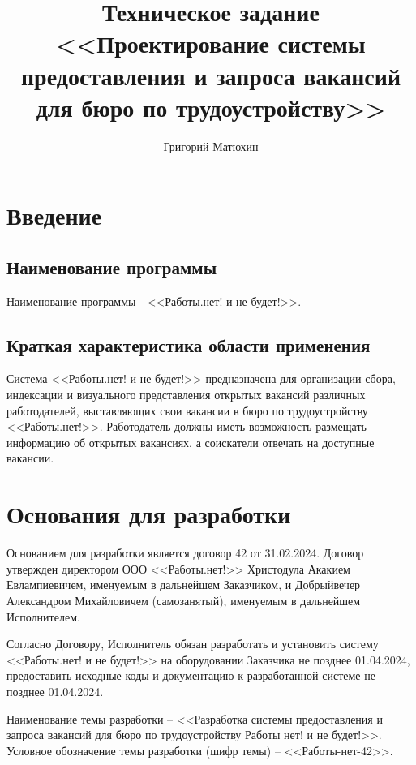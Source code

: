 \documentclass[a4page]{article}
\author{Григорий Матюхин}
\date{\DTMDisplaydate{2024}{2}{27}{-1}}
\title{Техническое задание\\ \Large<<Проектирование системы предоставления и запроса вакансий для бюро по трудоустройству>>}
\begin{document}
\maketitle
\thispagestyle{empty}

\newpage

\tableofcontents

\newpage

\section{Введение}

\subsection{Наименование программы}

Наименование программы - <<Работы.нет! и не будет!>>.

\subsection{Краткая характеристика области применения}

Система <<Работы.нет! и не будет!>> предназначена для организации сбора, индексации и визуального представления открытых вакансий различных работодателей, выставляющих свои вакансии в бюро по трудоустройству <<Работы.нет!>>. Работодатель должны иметь возможность размещать информацию об открытых вакансиях, а соискатели отвечать на доступные вакансии.

\section{Основания для разработки}

Основанием для разработки является договор 42 от 31.02.2024. Договор утвержден директором ООО <<Работы.нет!>> Христодула Акакием Евлампиевичем, именуемым в дальнейшем Заказчиком, и Добрыйвечер Александром Михайловичем (самозанятый), именуемым в дальнейшем Исполнителем.

Согласно Договору, Исполнитель обязан разработать и установить систему <<Работы.нет! и не будет!>> на оборудовании Заказчика не позднее 01.04.2024, предоставить исходные коды и документацию к разработанной системе не позднее 01.04.2024.

Наименование темы разработки – <<Разработка системы предоставления и запроса вакансий для бюро по трудоустройству Работы нет! и не будет!>>.
Условное обозначение темы разработки (шифр темы) – <<Работы-нет-42>>.
\end{document}

